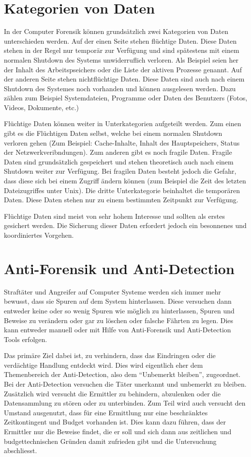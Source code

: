 \section{Kategorien von Daten}
In der Computer Forensik können grundsätzlich zwei Kategorien von Daten unterschieden werden. Auf der einen Seite stehen flüchtige Daten. Diese Daten stehen in der Regel nur temporär zur Verfügung und sind spätestens mit einem normalen Shutdown des Systems unwiderruflich verloren. Als Beispiel seien her der Inhalt des Arbeitspseichers oder die Liste der aktiven Prozesse genannt. Auf der anderen Seite stehen nichtflüchtige Daten. Diese Daten sind auch nach einem Shutdown des Systemes noch vorhanden und können ausgelesen werden. Dazu zählen zum Beispiel Systemdateien, Programme oder Daten des Benutzers (Fotos, Videos, Dokumente, etc.)

Flüchtige Daten können weiter in Unterkategorien aufgeteilt werden. Zum einen gibt es die Flüchtigen Daten selbst, welche bei einem normalen Shutdown verloren gehen (Zum Beispiel: Cache-Inhalte, Inhalt des Hauptspeichers, Status der Netzwerkveribndungen). Zum anderen gibt es noch fragile Daten. Fragile Daten sind grundsätzlich gespeichert und stehen theoretisch auch nach einem Shutdown weiter zur Verfügung. Bei fragilen Daten besteht jedoch die Gefahr, dass diese sich bei einem Zugriff ändern können (zum Beispiel die Zeit des letzten Dateizugriffes unter Unix). Die dritte Unterkategorie beinhaltet die temporären Daten. Diese Daten stehen nur zu einem bestimmten Zeitpunkt zur Verfügung.

Flüchtige Daten sind meist von sehr hohem Interesse und sollten als erstes gesichert werden. Die Sicherung dieser Daten erfordert jedoch ein besonnenes und koordiniertes Vorgehen.

\section{Anti-Forensik und Anti-Detection}
Straftäter und Angreifer auf Computer Systeme werden sich immer mehr bewusst, dass sie Spuren auf dem System hinterlassen. Diese versuchen dann entweder keine oder so wenig Spuren wie möglich zu hinterlassen, Spuren und Beweise zu verändern oder gar zu löschen oder falsche Fährten zu legen. Dies kann entweder manuell oder mit Hilfe von Anti-Forensik und Anti-Detection Tools erfolgen.

Das primäre Ziel dabei ist, zu verhindern, dass das Eindringen oder die verdächtige Handlung entdeckt wird. Dies wird eigentlich eher dem Themenbereich der Anti-Detection, also dem "`Unbemerkt bleiben"', zugeordnet. Bei der Anti-Detection versuchen die Täter unerkannt und unbemerkt zu bleiben. Zusätzlich wird versucht die Ermittler zu behindern, abzulenken oder die Datensammlung zu stören oder zu unterbinden. Zum Teil wird auch versucht den Umstand ausgenutzt, dass für eine Ermittlung nur eine beschränktes Zeitkontingent und Budget vorhanden ist. Dies kann dazu führen, dass der Ermittler nur die Beweise findet, die er soll und sich dann aus zeitlichen und budgettechnischen Gründen damit zufrieden gibt und die Untersuchung abschliesst.

